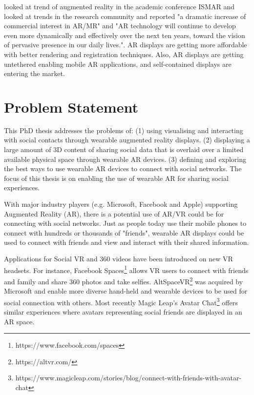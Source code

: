 \cite{Zhou2008, Kim2018} looked at trend of augmented reality in the academic conference ISMAR and looked at trends in the research community and reported "a dramatic increase of commercial interest in AR/MR" and "AR technology will continue to develop even more dynamically and effectively over the next ten years, toward the vision of pervasive presence in our daily lives.". AR displays are getting more affordable with better rendering and registration techniques. Also, AR displays are getting untethered enabling mobile AR applications, and self-contained displays are entering the market.

\section{Problem Statement}

This PhD thesis addresses the problems of: 
(1) using visualising and interacting with social contacts through wearable augmented reality displays. 
(2) displaying a large amount of 3D content of sharing social data that is overlaid over a limited available physical space through wearable AR devices. 
(3) defining and exploring the best ways to use wearable AR devices to connect with social networks.
The focus of this thesis is on enabling the use of wearable AR for sharing social experiences. 


With major industry players (e.g. Microsoft, Facebook and Apple) supporting Augmented Reality (AR), there is a potential use of AR/VR could be for connecting with social networks. Just as people today use their mobile phones to connect with hundreds or thousands of "friends", wearable AR displays could be used to connect with friends and view and interact with their shared information.

Applications for Social VR and 360 videos have been introduced on new VR headsets. For instance, Facebook Spaces\footnote{https://www.facebook.com/spaces} allows VR users to connect with friends and family and share 360 photos and take selfies. AltSpaceVR\footnote{https://altvr.com/} was acquired by Microsoft and enable more diverse hand-held and wearable devices to be used for social connection with others. Most recently Magic Leap's Avatar Chat\footnote{https://www.magicleap.com/stories/blog/connect-with-friends-with-avatar-chat} offers similar experiences where avatars representing social friends are displayed in an AR space. 

